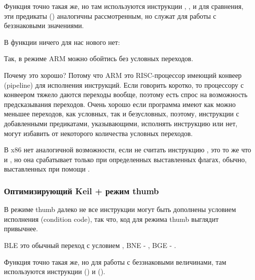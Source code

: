 Функция  точно такая же, но там используются инструкции , , 
и  для сравнения,
эти предикаты () аналогичны рассмотренным,
но служат для работы с беззнаковыми значениями.

В функции \main ничего для нас нового нет:



Так, в режиме ARM можно обойтись без условных переходов.

Почему это хорошо? Потому что ARM это RISC-процессор имеющий конвеер (pipeline) для исполнения инструкций. 
Если говорить 
коротко, то процессору с конвеером тяжело даются переходы вообще, поэтому есть спрос на возможность 
предсказывания переходов.
Очень хорошо если программа имеют как можно меньшее переходов, как условных, так и безусловных, поэтому, 
инструкции с добавленными предикатами, указывающими,
исполнять инструкцию или нет, могут избавить от некоторого количества условных переходов.

В x86 нет аналогичной возможности, если не считать инструкцию , это то же что и \MOV, но она срабатывает
только при определенных выставленных флагах, обычно, выставленных при помощи \CMP.

\subsubsection{Оптимизирующий Keil + режим thumb}



В режиме thumb далеко не все инструкции могут быть дополнены условием исполнения (condition code), так что,
код для режима thumb выглядит привычнее.

BLE это обычный переход с условием , BNE - , BGE - .

Функция  точно такая же, но для работы с беззнаковыми величинами, там используются 
инструкции  () и  ().

